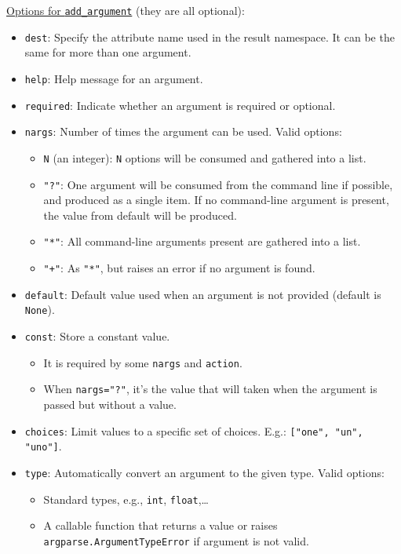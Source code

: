 \documentclass[a4paper,12pt,%
              final%
              ]{article}
\begin{document}
\medskip
\href{https://docs.python.org/3/library/argparse.html#quick-links-for-add-argument}{Options for \texttt{add\_argument}} (they are all optional):
\begin{itemize}
  \item \texttt{dest}: Specify the attribute name used in the result namespace. It can be the same for more than one argument.
  \item \texttt{help}: Help message for an argument.
  \item \texttt{required}: Indicate whether an argument is required or optional.
  \item \texttt{nargs}: Number of times the argument can be used. Valid options:
    \begin{itemize}
      \item \texttt{N} (an integer): \texttt{N} options will be consumed and gathered into a list.
      \item \texttt{"?"}: One argument will be consumed from the command line if possible, and produced as a single item. If no command-line argument is present, the value from default will be produced.
      \item \texttt{"*"}: All command-line arguments present are gathered into a list.
      \item \texttt{"+"}: As \texttt{"*"}, but raises an error if no argument is found.
    \end{itemize}
  \item \texttt{default}: Default value used when an argument is not provided (default is \texttt{None}).
  \item \texttt{const}: Store a constant value.
    \begin{itemize}
      \item It is required by some \texttt{nargs} and \texttt{action}.
      \item When \texttt{nargs="?"}, it's the value that will taken when the argument is passed but without a value.
    \end{itemize}
  \item \texttt{choices}: Limit values to a specific set of choices. E.g.: \verb|["one", "un", "uno"]|.
  \item \texttt{type}: Automatically convert an argument to the given type. Valid options:
    \begin{itemize}
      \item Standard types, e.g., \texttt{int}, \texttt{float},\ldots
      \item A callable function that returns a value or raises \verb|argparse.ArgumentTypeError| if argument is not valid.

\end{itemize}
\end{itemize}
\end{document}
